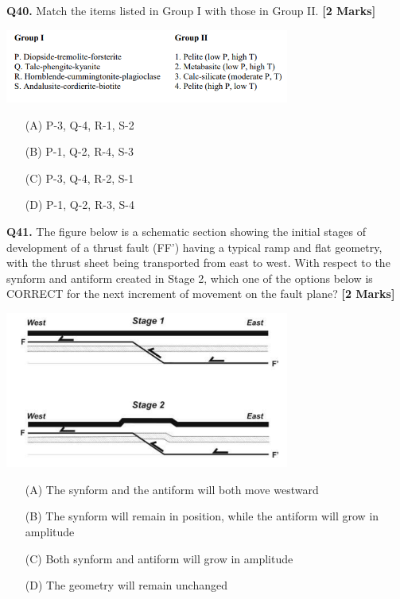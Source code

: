 \documentclass[11pt]{article}
\newcommand{\questionb}[2]{
    \noindent\textbf{Q#2.} #1 \hfill \textbf{[2 Marks]}
}
\begin{document}
\questionb{Match the items listed in Group I with those in Group II.}{40}
\begin{center}
\includegraphics[width=0.7\textwidth]{figures/40.png}
\end{center}
\begin{enumerate}
    \item[(A)] P-3, Q-4, R-1, S-2
    \item[(B)] P-1, Q-2, R-4, S-3
    \item[(C)] P-3, Q-4, R-2, S-1
    \item[(D)] P-1, Q-2, R-3, S-4
\end{enumerate}
\vspace{0.5cm}

\questionb{The figure below is a schematic section showing the initial stages of development of a thrust fault (FF') having a typical ramp and flat geometry, with the thrust sheet being transported from east to west. With respect to the synform and antiform created in Stage 2, which one of the options below is CORRECT for the next increment of movement on the fault plane?}{41}
\begin{center}
\includegraphics[width=0.7\textwidth]{figures/41}
\end{center}
\begin{enumerate}
    \item[(A)] The synform and the antiform will both move westward
    \item[(B)] The synform will remain in position, while the antiform will grow in amplitude
    \item[(C)] Both synform and antiform will grow in amplitude
    \item[(D)] The geometry will remain unchanged
\end{enumerate}
\vspace{0.5cm}
\end{document}
